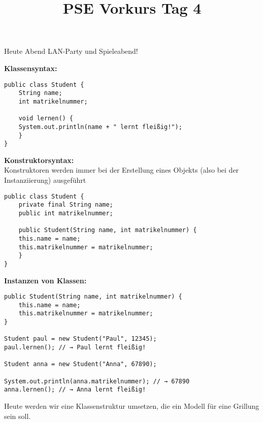\documentclass{../../sheet}
\title{PSE Vorkurs Tag 4}
\begin{document}
\maketitle
Heute Abend LAN-Party und Spieleabend!

\textbf{Klassensyntax:}
	\begin{verbatim}
public class Student {
    String name;
    int matrikelnummer;

    void lernen() {
	System.out.println(name + " lernt fleißig!");
    }
}
\end{verbatim}

\textbf{Konstruktorsyntax:}\\
Konstruktoren werden immer bei der Erstellung eines Objekts (also bei der Instanziierung) ausgeführt
	\begin{verbatim}
public class Student {
    private final String name;
    public int matrikelnummer;

    public Student(String name, int matrikelnummer) {
	this.name = name;
	this.matrikelnummer = matrikelnummer;
    }
}
	\end{verbatim}

\textbf{Instanzen von Klassen:}
	
	\begin{verbatim}
public Student(String name, int matrikelnummer) {
    this.name = name;
    this.matrikelnummer = matrikelnummer;
}

Student paul = new Student("Paul", 12345);
paul.lernen(); // → Paul lernt fleißig!

Student anna = new Student("Anna", 67890);

System.out.println(anna.matrikelnummer); // → 67890
anna.lernen(); // → Anna lernt fleißig!

	\end{verbatim}
	


\newpage

Heute werden wir eine Klassenstruktur umsetzen, die ein Modell für eine Grillung sein soll.
\end{document}
